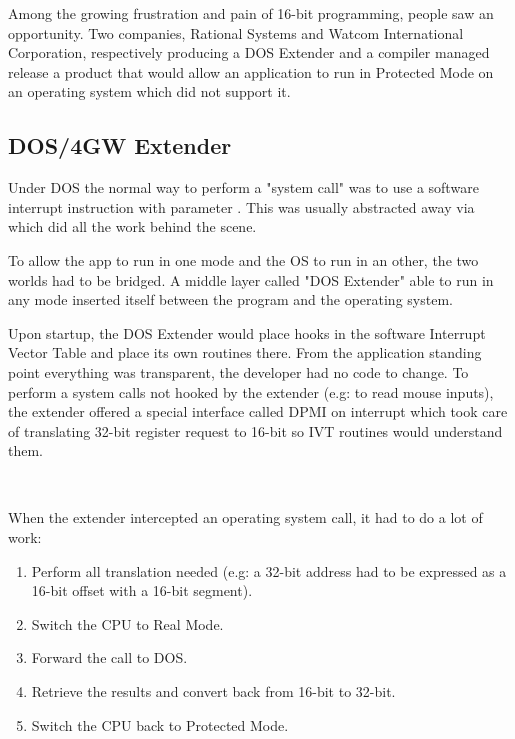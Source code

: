 \par
Among the growing frustration and pain of 16-bit programming, people saw an opportunity. Two companies, Rational Systems and Watcom International Corporation, respectively producing a DOS Extender and a compiler managed release a product that would allow an application to run in Protected Mode on an operating system which did not support it.\\
\par


\subsection{DOS/4GW Extender}
Under DOS the normal way to perform a "system call" was to use a software interrupt instruction with parameter . This was usually abstracted away via  which did all the work behind the scene.\\
\par
{}
To allow the app to run in one mode and the OS to run in an other, the two worlds had to be bridged. A middle layer called "DOS Extender" able to run in any mode inserted itself between the program and the operating system.\\

\par
{}
Upon startup, the DOS Extender would place hooks in the software Interrupt Vector Table and place its own routines there. From the application standing point everything was transparent, the developer had no code to change. To perform a system calls not hooked by the extender (e.g:  to read mouse inputs), the extender offered a special interface called DPMI on interrupt  which took care of translating 32-bit register request to 16-bit so IVT routines would understand them.\\
\par
{}\\
\par
When the extender intercepted an operating system call, it had to do a lot of work:
\begin{enumerate}
\item Perform all translation needed (e.g: a 32-bit address had to be expressed as a 16-bit offset with a 16-bit segment).
\item Switch the CPU to Real Mode.
\item Forward the call to DOS.
\item Retrieve the results and convert back from 16-bit to 32-bit.
\item Switch the CPU back to Protected Mode.
\end{enumerate} 

